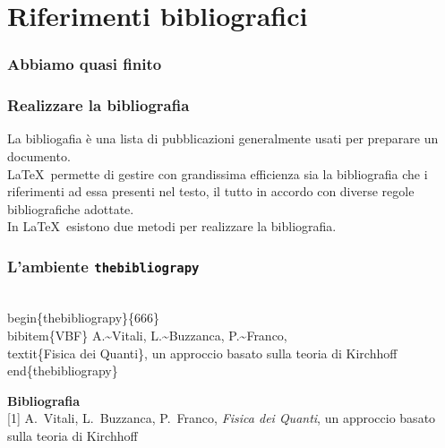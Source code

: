 \section{Riferimenti bibliografici}
\begin{frame}
  \frametitle{Abbiamo quasi finito}
\end{frame}
\begin{frame}
  \frametitle{Realizzare la bibliografia}
	La bibliogafia \`e una lista di pubblicazioni generalmente usati per preparare un documento. \\
  \medskip
	\LaTeX\ permette di gestire con grandissima efficienza sia la bibliografia che i riferimenti ad essa presenti nel testo, il tutto in accordo con diverse regole bibliografiche adottate.\\
  \bigskip
	In \LaTeX\ esistono due metodi per realizzare la bibliografia.
\end{frame}
\begin{frame}
  \frametitle{L'ambiente \texttt{thebibliograpy}}
	\begin{LaTeXcode}
		\alert{\\begin\{thebibliograpy\}\{666\}}\n
		\hspace*{5ex}\\bibitem\{VBF\}\n
		\hspace*{5ex}A.\textasciitilde Vitali, L.\textasciitilde Buzzanca, P.\textasciitilde Franco,\n
		\hspace*{5ex}\\textit\{Fisica dei Quanti\},\n
		\hspace*{5ex}un approccio basato sulla teoria di Kirchhoff\n
		\alert{\\end\{thebibliograpy\}}
	\end{LaTeXcode}
	\begin{LaTeXoutput}
		\textbf{\Large Bibliografia}\\[2ex]
		[1] A.~Vitali, L.~Buzzanca, P.~Franco, \textit{Fisica dei Quanti}, un approccio basato sulla teoria di Kirchhoff
	\end{LaTeXoutput}
\end{frame}
